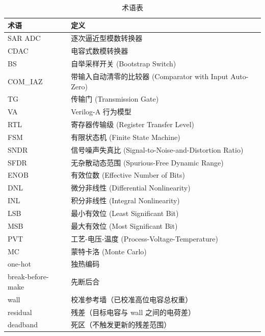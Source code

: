 \documentclass[UTF8,a4paper,11pt]{ctexart}
\begin{document}
\begin{table}[H]
\centering
\caption{术语表}
\label{tab:app-glossary}
\scriptsize
\begin{tabular}{p{4cm}p{9cm}}
\toprule
术语 & 定义 \\
\midrule
SAR ADC                       & 逐次逼近型模数转换器 \\
CDAC                          & 电容式数模转换器 \\
BS                            & 自举采样开关 (Bootstrap Switch) \\
COM\_IAZ                      & 带输入自动清零的比较器 (Comparator with Input Auto-Zero) \\
TG                            & 传输门 (Transmission Gate) \\
VA                            & Verilog-A 行为模型 \\
RTL                           & 寄存器传输级 (Register Transfer Level) \\
FSM                           & 有限状态机 (Finite State Machine) \\
SNDR                          & 信号噪声失真比 (Signal-to-Noise-and-Distortion Ratio) \\
SFDR                          & 无杂散动态范围 (Spurious-Free Dynamic Range) \\
ENOB                          & 有效位数 (Effective Number of Bits) \\
DNL                           & 微分非线性 (Differential Nonlinearity) \\
INL                           & 积分非线性 (Integral Nonlinearity) \\
LSB                           & 最小有效位 (Least Significant Bit) \\
MSB                           & 最大有效位 (Most Significant Bit) \\
PVT                           & 工艺-电压-温度 (Process-Voltage-Temperature) \\
MC                            & 蒙特卡洛 (Monte Carlo) \\
one-hot                       & 独热编码 \\
break-before-make             & 先断后合 \\
wall                          & 校准参考墙（已校准高位电容总权重） \\
residual                      & 残差（目标电容与 wall 之间的电荷差） \\
deadband                      & 死区（不触发更新的残差范围） \\

\end{tabular}
\end{table}
\end{document}
